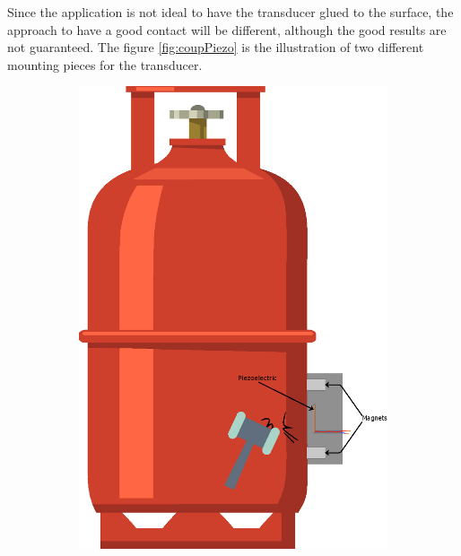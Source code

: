 Since the application is not ideal to have the transducer glued to the surface, the approach to have a good contact will be different, although the good results are not guaranteed. The figure \ref{fig:coupPiezo} is the illustration of two different mounting pieces for the transducer.
\begin{figure}[]
    \centering
    \begin{subfigure}{0.3\textwidth}
        \centering
        \includegraphics[width=\linewidth]{Chapters/4CHP/Figures/PiezoMagnetsSlot.eps}
        \caption{}{}
        \label{subfig:piezoslot}
    \end{subfigure}
    \begin{subfigure}{0.3\textwidth}
        \centering

\end{subfigure}
\end{figure}
